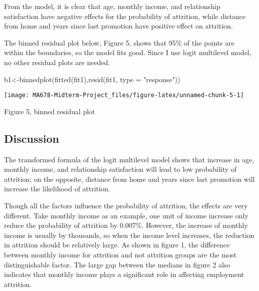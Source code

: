 \documentclass[
]{article}
\newenvironment{Shaded}{\begin{snugshade}}{\end{snugshade}}
\newcommand{\AttributeTok}[1]{\textcolor[rgb]{0.77,0.63,0.00}{#1}}
\newcommand{\FunctionTok}[1]{\textcolor[rgb]{0.00,0.00,0.00}{#1}}
\newcommand{\NormalTok}[1]{#1}
\newcommand{\OtherTok}[1]{\textcolor[rgb]{0.56,0.35,0.01}{#1}}
\newcommand{\StringTok}[1]{\textcolor[rgb]{0.31,0.60,0.02}{#1}}
\begin{document}
From the model, it is clear that age, monthly income, and relationship
satisfaction have negative effects for the probability of attrition,
while distance from home and years since last promotion have positive
effect on attrition.

The binned residual plot below, Figure 5, shows that 95\% of the points
are within the boundaries, so the model fits good. Since I use logit
multilevel model, no other residual plots are needed.

\begin{Shaded}
\begin{Highlighting}[]
\NormalTok{b1}\OtherTok{\textless{}{-}}\FunctionTok{binnedplot}\NormalTok{(}\FunctionTok{fitted}\NormalTok{(fit1),}\FunctionTok{resid}\NormalTok{(fit1, }\AttributeTok{type =} \StringTok{"response"}\NormalTok{))}
\end{Highlighting}
\end{Shaded}

\begin{center}\texttt{[image: MA678-Midterm-Project\_files/figure-latex/unnamed-chunk-5-1]} \end{center}

Figure 5, binned residual plot

\hypertarget{discussion}{%
\subsection{Discussion}\label{discussion}}

The transformed formula of the logit multilevel model shows that
increase in age, monthly income, and relationship satisfaction will lead
to low probability of attrition; on the opposite, distance from home and
years since last promotion will increase the likelihood of attrition.

Though all the factors influence the probability of attrition, the
effects are very different. Take monthly income as an example, one unit
of income increase only reduce the probability of attrition by 0.007\%.
However, the increase of monthly income is usually by thousands, so when
the income level increases, the reduction in attrition should be
relatively large. As shown in figure 1, the difference between monthly
income for attrition and not attrition groups are the most
distinguishable factor. The large gap between the medians in figure 2
also indicates that monthly income plays a significant role in affecting
employment attrition.
\end{document}
